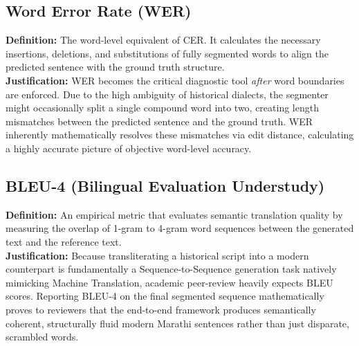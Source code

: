 \documentclass[journal, onecolumn]{IEEEtran}
\begin{document}
\subsection{Word Error Rate (WER)}
\textbf{Definition:} The word-level equivalent of CER. It calculates the necessary insertions, deletions, and substitutions of fully segmented words to align the predicted sentence with the ground truth structure.
\\[5pt]
\textbf{Justification:} WER becomes the critical diagnostic tool \textit{after} word boundaries are enforced. Due to the high ambiguity of historical dialects, the segmenter might occasionally split a single compound word into two, creating length mismatches between the predicted sentence and the ground truth. WER inherently mathematically resolves these mismatches via edit distance, calculating a highly accurate picture of objective word-level accuracy.

\subsection{BLEU-4 (Bilingual Evaluation Understudy)}
\textbf{Definition:} An empirical metric that evaluates semantic translation quality by measuring the overlap of 1-gram to 4-gram word sequences between the generated text and the reference text.
\\[5pt]
\textbf{Justification:} Because transliterating a historical script into a modern counterpart is fundamentally a Sequence-to-Sequence generation task natively mimicking Machine Translation, academic peer-review heavily expects BLEU scores. Reporting BLEU-4 on the final segmented sequence mathematically proves to reviewers that the end-to-end framework produces semantically coherent, structurally fluid modern Marathi sentences rather than just disparate, scrambled words.
\end{document}
